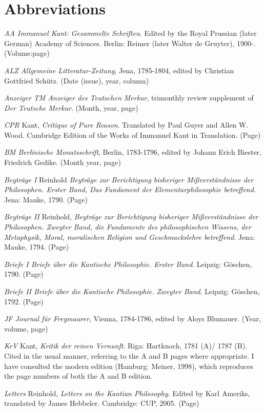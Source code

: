 
\chapter{Abbreviations }


\textit{AA Immanuel Kant: Gesammelte Schriften}. Edited by the Royal Prussian (later German) Academy of Sciences. Berlin: Reimer (later Walter de Gruyter), 1900{-}. (Volume:page)

\textit{ALZ Allgemeine Litteratur{-}Zeitung}, Jena, 1785{-}1804, edited by Christian Gottfried Sch\"{u}tz. (Date (issue), year, column)

\textit{Anzeiger TM Anzeiger des Teutschen Merkur}, trimonthly review supplement of \textit{Der Teutsche Merkur}. (Month, year, page)

\textit{CPR }Kant, \textit{Critique of Pure Reason}. Translated by Paul Guyer and Allen W. Wood. Cambridge Edition of the Works of Immanuel Kant in Translation. (Page) 

\textit{BM Berlinische Monatsschrift}, Berlin, 1783{-}1796, edited by Johann Erich Biester, Friedrich Gedike. (Month year, page) 

\textit{Beytr\"{a}ge I }Reinhold \textit{Beytr\"{a}ge zur Berichtigung bisheriger Mi\ss{}verst\"{a}ndnisse der Philosophen. Erster Band, Das Fundament der Elementarphilosophie betreffend}. Jena: Mauke, 1790. (Page)

\textit{Beytr\"{a}ge II }Reinhold, \textit{Beytr\"{a}ge zur Berichtigung bisheriger Mi\ss{}verst\"{a}ndnisse der Philosophen. Zweyter Band, die Fundamente des philosophischen Wissens, der Metaphysik, Moral, moralischen Religion und Geschmackslehre betreffend}. Jena: Mauke, 1794. (Page)

\textit{Briefe I Briefe \"{u}ber die Kantische Philosophie. Erster Band}. Leipzig: G\"{o}schen, 1790. (Page)

\textit{Briefe II Briefe \"{u}ber die Kantische Philosophie. Zweyter Band}. Leipzig: G\"{o}schen, 1792. (Page)

\textit{JF Journal f\"{u}r Freymaurer}, Vienna, 1784{-}1786, edited by Aloys Blumauer. (Year, volume, page)

\textit{KrV }Kant, \textit{Kritik der reinen Vernunft}. Riga: Hartknoch, 1781 (A)/ 1787 (B). Cited in the usual manner, referring to the A and B pages where appropriate. I have consulted the modern edition (Hamburg: Meiner, 1998), which reproduces the page numbers of both the A and B edition. 

\textit{Letters }Reinhold, \textit{Letters on the Kantian Philosophy}. Edited by Karl Ameriks, translated by James Hebbeler. Cambridge: CUP, 2005. (Page)

